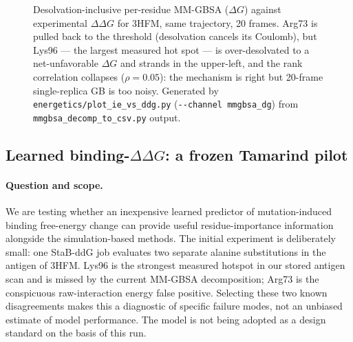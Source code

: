 \begin{figure}[h]
\centering
{}
\caption{Desolvation-inclusive per-residue MM-GBSA ($\Delta G$) against experimental $\Delta\Delta G$
for 3HFM, same trajectory, 20 frames. Arg73 is pulled back to the threshold (desolvation cancels its
Coulomb), but Lys96 --- the largest measured hot spot --- is over-desolvated to a net-unfavorable
$\Delta G$ and strands in the upper-left, and the rank correlation collapses ($\rho = 0.05$): the
mechanism is right but 20-frame single-replica GB is too noisy. Generated by
\texttt{energetics/plot\_ie\_vs\_ddg.py} (\texttt{-{}-channel mmgbsa\_dg}) from
\texttt{mmgbsa\_decomp\_to\_csv.py} output.}
\label{fig:ie_vs_ddg_mmgbsa}
\end{figure}


\subsection{Learned binding-$\Delta\Delta G$: a frozen Tamarind pilot}
\label{sec:tamarind_pilot}
\paragraph{Question and scope.}
We are testing whether an inexpensive learned predictor of mutation-induced binding free-energy
change can provide useful residue-importance information alongside the simulation-based methods.
The initial experiment is deliberately small: one StaB-ddG job evaluates two separate alanine
substitutions in the antigen of 3HFM. Lys96 is the strongest measured hotspot in our stored antigen
scan and is missed by the current MM-GBSA decomposition; Arg73 is the conspicuous raw-interaction
energy false positive. Selecting these two known disagreements makes this a diagnostic of specific
failure modes, not an unbiased estimate of model performance. The model is not being adopted as a
design standard on the basis of this run.

